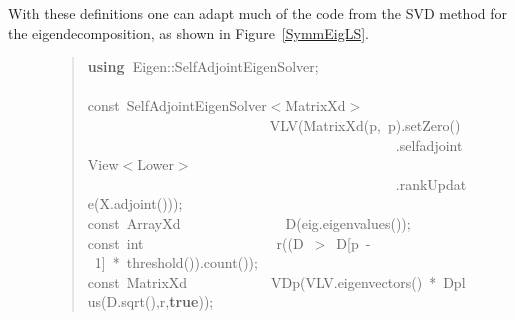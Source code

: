 \documentclass[shortnames,article]{jss}
\newcommand{\hlstd}[1]{\textcolor[rgb]{0,0,0}{#1}}
\newcommand{\hlnum}[1]{\textcolor[rgb]{0,0,0}{#1}}
\newcommand{\hlopt}[1]{\textcolor[rgb]{0,0,0}{#1}}
\newcommand{\hlkwa}[1]{\textcolor[rgb]{0.61,0.13,0.93}{\bf{#1}}}
\newcommand{\hlkwb}[1]{\textcolor[rgb]{0.13,0.54,0.13}{#1}}
\newcommand{\hlkwd}[1]{\textcolor[rgb]{0,0,0}{#1}}
\begin{document}
With these definitions one can adapt much of the code from the SVD
method for the eigendecomposition, as shown in Figure~\ref{SymmEigLS}.
\begin{figure}[htb]
  \begin{quote}
    \noindent
    \ttfamily
    \hlstd{}\hlkwa{using\ }\hlstd{Eigen}\hlopt{::}\hlstd{SelfAdjointEigenSolver}\hlopt{;}\hspace*{\fill}\\
    \hlstd{}\hspace*{\fill}\\
    \hlkwb{const\ }\hlstd{SelfAdjointEigenSolver}\hlopt{$<$}\hlstd{MatrixXd}\hlopt{$>$}\hspace*{\fill}\\
    \hlstd{}\hlstd{\ \ \ \ \ \ \ \ \ \ \ \ \ \ \ \ \ \ \ \ \ \ \ \ \ \ }\hlstd{}\hlkwd{VLV}\hlstd{}\hlopt{(}\hlstd{}\hlkwd{MatrixXd}\hlstd{}\hlopt{(}\hlstd{p}\hlopt{,\ }\hlstd{p}\hlopt{).}\hlstd{}\hlkwd{setZero}\hlstd{}\hlopt{()}\hspace*{\fill}\\
    \hlstd{}\hlstd{\ \ \ \ \ \ \ \ \ \ \ \ \ \ \ \ \ \ \ \ \ \ \ \ \ \ \ \ \ \ \ \ \ \ \ \ \ \ \ \ \ \ \ \ }\hlstd{}\hlopt{.}\hlstd{selfadjointView}\hlopt{$<$}\hlstd{Lower}\hlopt{$>$}\hspace*{\fill}\\
    \hlstd{}\hlstd{\ \ \ \ \ \ \ \ \ \ \ \ \ \ \ \ \ \ \ \ \ \ \ \ \ \ \ \ \ \ \ \ \ \ \ \ \ \ \ \ \ \ \ \ }\hlstd{}\hlopt{.}\hlstd{}\hlkwd{rankUpdate}\hlstd{}\hlopt{(}\hlstd{X}\hlopt{.}\hlstd{}\hlkwd{adjoint}\hlstd{}\hlopt{()));}\hspace*{\fill}\\
    \hlstd{}\hlkwb{const\ }\hlstd{ArrayXd}\hlstd{\ \ \ \ \ \ \ \ \ \ \ \ \ \ \ }\hlstd{}\hlkwd{D}\hlstd{}\hlopt{(}\hlstd{eig}\hlopt{.}\hlstd{}\hlkwd{eigenvalues}\hlstd{}\hlopt{());}\hspace*{\fill}\\
    \hlstd{}\hlkwb{const\ int}\hlstd{\ \ \ \ \ \ \ \ \ \ \ \ \ \ \ \ \ \ \ }\hlkwb{}\hlstd{}\hlkwd{r}\hlstd{}\hlopt{((}\hlstd{D\ }\hlopt{$>$\ }\hlstd{D}\hlopt{{[}}\hlstd{p\ }\hlopt{{-}\ }\hlstd{}\hlnum{1}\hlstd{}\hlopt{{]}\ {*}\ }\hlstd{}\hlkwd{threshold}\hlstd{}\hlopt{()).}\hlstd{}\hlkwd{count}\hlstd{}\hlopt{());}\hspace*{\fill}\\
    \hlstd{}\hlkwb{const\ }\hlstd{MatrixXd}\hlstd{\ \ \ \ \ \ \ \ \ \ \ \ }\hlstd{}\hlkwd{VDp}\hlstd{}\hlopt{(}\hlstd{VLV}\hlopt{.}\hlstd{}\hlkwd{eigenvectors}\hlstd{}\hlopt{()\ {*}\ }\hlstd{}\hlkwd{Dplus}\hlstd{}\hlopt{(}\hlstd{D}\hlopt{.}\hlstd{}\hlkwd{sqrt}\hlstd{}\hlopt{(),}\hlstd{r}\hlopt{,}\hlstd{}\hlkwa{true}\hlstd{}\hlopt{));}\hspace*{\fill}\\

\end{quote}
\end{figure}
\end{document}

